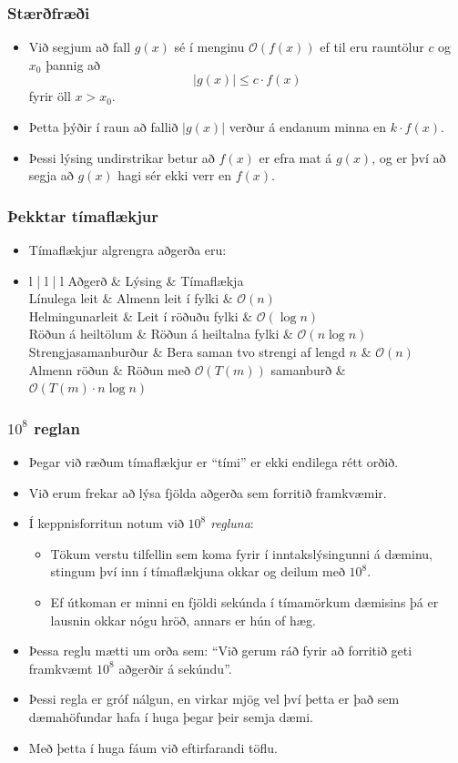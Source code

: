\documentclass[handout]{beamer}
\newcommand\env[2]
{
	\begin{#1}
	#2
	\end{#1}
}
\begin{document}
\env{frame}
{
	\frametitle{Stærðfræði}
	\env{itemize}
	{
		\item<1-> Við segjum að fall $g(x)$ sé í menginu $\mathcal{O}(f(x))$ ef til eru rauntölur $c$ og $x_0$ þannig að
		\[
			|g(x)| \leq c \cdot f(x)
		\]
		fyrir öll $x > x_0$.
		\item<2-> Þetta þýðir í raun að fallið $|g(x)|$ verður á endanum minna en $k \cdot f(x)$.
		\item<3-> Þessi lýsing undirstrikar betur að $f(x)$ er efra mat á $g(x)$, og er því að segja að $g(x)$ hagi sér ekki verr en $f(x)$.
	}
}

\env{frame}
{
	\frametitle{Þekktar tímaflækjur}
	\env{itemize}
	{
		\item<1-> Tímaflækjur algrengra aðgerða eru:
		\item<2->
		\tiny
		\env{tabular}
		{
			{l | l | l}
			Aðgerð & Lýsing & Tímaflækja\\
			\hline
			Línulega leit & Almenn leit í fylki & $\mathcal{O}(n)$\\
			Helmingunarleit & Leit í röðuðu fylki & $\mathcal{O}(\log n)$\\
			Röðun á heiltölum & Röðun á heiltalna fylki & $\mathcal{O}(n \log n)$\\
			Strengjasamanburður & Bera saman tvo strengi af lengd $n$ & $\mathcal{O}(n)$\\
			Almenn röðun & Röðun með $\mathcal{O}(T(m))$ samanburð & $\mathcal{O}(T(m) \cdot n \log n)$\\
		}
	}
}

\env{frame}
{
	\frametitle{$10^8$ reglan}
	\env{itemize}
	{
		\item<1-> Þegar við ræðum tímaflækjur er ``tími'' er ekki endilega rétt orðið.
		\item<2-> Við erum frekar að lýsa fjölda aðgerða sem forritið framkvæmir.
		\item<3-> Í keppnisforritun notum við \emph{$10^8$ regluna}:
		\env{itemize}
		{
			\item<4-> Tökum verstu tilfellin sem koma fyrir í inntakslýsingunni á dæminu,
						stingum því inn í tímaflækjuna okkar
						og deilum með $10^8$.
			\item<5-> Ef útkoman er minni en fjöldi sekúnda í tímamörkum dæmisins þá er lausnin okkar nógu hröð, annars er hún of hæg.
		}
		\item<6-> Þessa reglu mætti um orða sem: ``Við gerum ráð fyrir að forritið geti framkvæmt $10^8$ aðgerðir á sekúndu''.
		\item<7-> Þessi regla er gróf nálgun, en virkar mjög vel því þetta er það sem dæmahöfundar hafa í huga þegar þeir semja dæmi.
		\item<8-> Með þetta í huga fáum við eftirfarandi töflu.
	}
}
\end{document}
